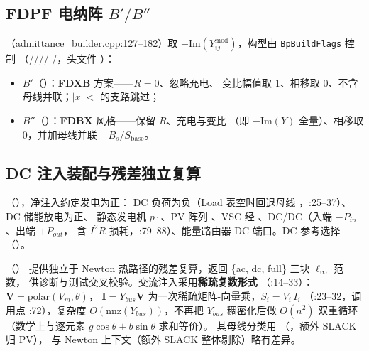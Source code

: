 \subsection{FDPF 电纳阵 $B'/B''$}
（admittance\_builder.cpp:127--182）取
$-\mathrm{Im}(Y^{\mathrm{mod}}_{ij})$，构型由 \texttt{BpBuildFlags} 控制
（////%
/，头文件
）：
\begin{itemize}
  \item $B'$（）：\textbf{FDXB} 方案——$R=0$、忽略充电、
        变比幅值取 1、相移取 0、不含母线并联；$|x|<$ 的支路跳过；
  \item $B''$（）：\textbf{FDBX} 风格——保留 $R$、充电与变比
        （即 $-\mathrm{Im}(Y)$ 全量）、相移取 0，并加母线并联 $-B_s/S_{\mathrm{base}}$。
\end{itemize}

\subsection{DC 注入装配与残差独立复算}
（），净注入约定发电为正：
DC 负荷为负（Load 表空时回退母线 ，:25--37）、DC 储能放电为正、
静态发电机 $p\cdot$、PV 阵列 、VSC 经
、DC/DC（入端 $-P_{in}$、出端 $+P_{out}$，
含 $I^2R$ 损耗，:79--88）、能量路由器 DC 端口。DC 参考选择
（）。

（）
提供独立于 Newton 热路径的残差复算，返回 \{ac, dc, full\} 三块 $\ell_\infty$ 范数，
供诊断与测试交叉校验。交流注入采用\textbf{稀疏复数形式}
（:14--33）：$\mathbf V=\mathrm{polar}(V_m,\theta)$，
$\mathbf I=Y_{bus}\mathbf V$ 为一次稀疏矩阵-向量乘，$S_i=V_i\,\overline{I_i}$
（:23--32，调用点 :72），复杂度 $O(\mathrm{nnz}(Y_{bus}))$，不再把 $Y_{bus}$
稠密化后做 $O(n^2)$ 双重循环（数学上与逐元素 $g\cos\theta+b\sin\theta$ 求和等价）。
其母线分类用
（，额外 SLACK 归 PV），
与 Newton 上下文（额外 SLACK 整体剔除）略有差异。

